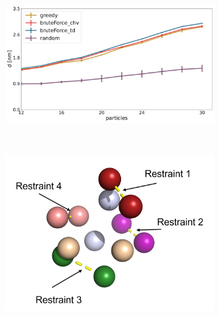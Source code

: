 \begin{figure}[H]
    \begin{subfigure}{0.45\columnwidth}
        \includegraphics[width=\textwidth]{fig/results/algorithm/restraint_distance_algorithms.png}
        \caption{}
        \label{fig: dist_algorithms}
    \end{subfigure}\\
    \begin{subfigure}{0.45\columnwidth}
        \includegraphics[width=\textwidth]{fig/results/algorithm/punktewolke_6_greedy_annotated.png}
        \caption{}
        \label{fig: greedyApproach_6Partikels}
    \end{subfigure}
    \begin{subfigure}{0.45\columnwidth}

\end{subfigure}
\end{figure}
